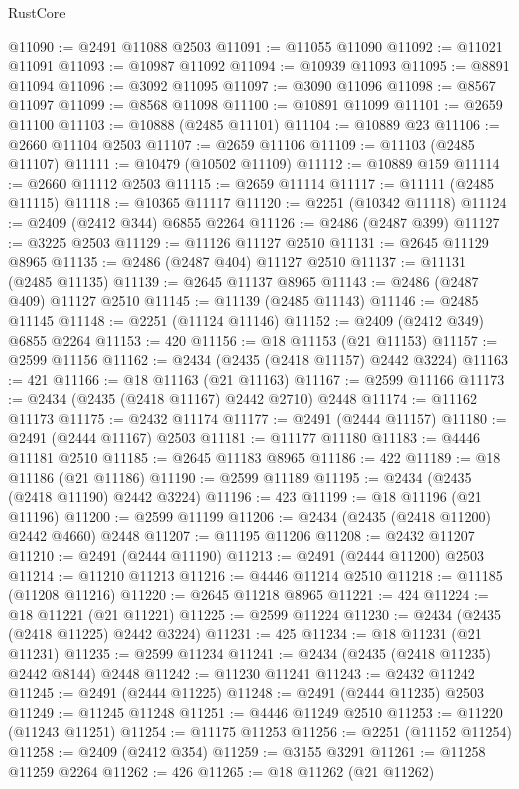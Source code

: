 \begin{lexlean}{RustCore}
\begin{coremodule}
@11090 := @2491 @11088 @2503
@11091 := @11055 @11090
@11092 := @11021 @11091
@11093 := @10987 @11092
@11094 := @10939 @11093
@11095 := @8891 @11094
@11096 := @3092 @11095
@11097 := @3090 @11096
@11098 := @8567 @11097
@11099 := @8568 @11098
@11100 := @10891 @11099
@11101 := @2659 @11100
@11103 := @10888 (@2485 @11101)
@11104 := @10889 @23
@11106 := @2660 @11104 @2503
@11107 := @2659 @11106
@11109 := @11103 (@2485 @11107)
@11111 := @10479 (@10502 @11109)
@11112 := @10889 @159
@11114 := @2660 @11112 @2503
@11115 := @2659 @11114
@11117 := @11111 (@2485 @11115)
@11118 := @10365 @11117
@11120 := @2251 (@10342 @11118)
@11124 := @2409 (@2412 @344) @6855 @2264
@11126 := @2486 (@2487 @399)
@11127 := @3225 @2503
@11129 := @11126 @11127 @2510
@11131 := @2645 @11129 @8965
@11135 := @2486 (@2487 @404) @11127 @2510
@11137 := @11131 (@2485 @11135)
@11139 := @2645 @11137 @8965
@11143 := @2486 (@2487 @409) @11127 @2510
@11145 := @11139 (@2485 @11143)
@11146 := @2485 @11145
@11148 := @2251 (@11124 @11146)
@11152 := @2409 (@2412 @349) @6855 @2264
@11153 := 420
@11156 := @18 @11153 (@21 @11153)
@11157 := @2599 @11156
@11162 := @2434 (@2435 (@2418 @11157) @2442 @3224)
@11163 := 421
@11166 := @18 @11163 (@21 @11163)
@11167 := @2599 @11166
@11173 := @2434 (@2435 (@2418 @11167) @2442 @2710) @2448
@11174 := @11162 @11173
@11175 := @2432 @11174
@11177 := @2491 (@2444 @11157)
@11180 := @2491 (@2444 @11167) @2503
@11181 := @11177 @11180
@11183 := @4446 @11181 @2510
@11185 := @2645 @11183 @8965
@11186 := 422
@11189 := @18 @11186 (@21 @11186)
@11190 := @2599 @11189
@11195 := @2434 (@2435 (@2418 @11190) @2442 @3224)
@11196 := 423
@11199 := @18 @11196 (@21 @11196)
@11200 := @2599 @11199
@11206 := @2434 (@2435 (@2418 @11200) @2442 @4660) @2448
@11207 := @11195 @11206
@11208 := @2432 @11207
@11210 := @2491 (@2444 @11190)
@11213 := @2491 (@2444 @11200) @2503
@11214 := @11210 @11213
@11216 := @4446 @11214 @2510
@11218 := @11185 (@11208 @11216)
@11220 := @2645 @11218 @8965
@11221 := 424
@11224 := @18 @11221 (@21 @11221)
@11225 := @2599 @11224
@11230 := @2434 (@2435 (@2418 @11225) @2442 @3224)
@11231 := 425
@11234 := @18 @11231 (@21 @11231)
@11235 := @2599 @11234
@11241 := @2434 (@2435 (@2418 @11235) @2442 @8144) @2448
@11242 := @11230 @11241
@11243 := @2432 @11242
@11245 := @2491 (@2444 @11225)
@11248 := @2491 (@2444 @11235) @2503
@11249 := @11245 @11248
@11251 := @4446 @11249 @2510
@11253 := @11220 (@11243 @11251)
@11254 := @11175 @11253
@11256 := @2251 (@11152 @11254)
@11258 := @2409 (@2412 @354)
@11259 := @3155 @3291
@11261 := @11258 @11259 @2264
@11262 := 426
@11265 := @18 @11262 (@21 @11262)

\end{coremodule}
\end{lexlean}
